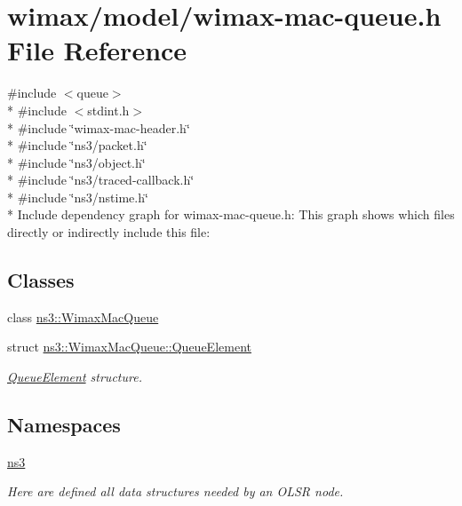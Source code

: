 \hypertarget{wimax-mac-queue_8h}{}\section{wimax/model/wimax-\/mac-\/queue.h File Reference}
\label{wimax-mac-queue_8h}
{\ttfamily \#include $<$queue$>$}\\*
{\ttfamily \#include $<$stdint.\+h$>$}\\*
{\ttfamily \#include \char`\"{}wimax-\/mac-\/header.\+h\char`\"{}}\\*
{\ttfamily \#include \char`\"{}ns3/packet.\+h\char`\"{}}\\*
{\ttfamily \#include \char`\"{}ns3/object.\+h\char`\"{}}\\*
{\ttfamily \#include \char`\"{}ns3/traced-\/callback.\+h\char`\"{}}\\*
{\ttfamily \#include \char`\"{}ns3/nstime.\+h\char`\"{}}\\*
Include dependency graph for wimax-\/mac-\/queue.h\+:
This graph shows which files directly or indirectly include this file\+:
\subsection*{Classes}
\begin{DoxyCompactItemize}
\item 
class \hyperlink{classns3_1_1WimaxMacQueue}{ns3\+::\+Wimax\+Mac\+Queue}
\item 
struct \hyperlink{structns3_1_1WimaxMacQueue_1_1QueueElement}{ns3\+::\+Wimax\+Mac\+Queue\+::\+Queue\+Element}
\begin{DoxyCompactList}\small\item\em \hyperlink{structns3_1_1WimaxMacQueue_1_1QueueElement}{Queue\+Element} structure. \end{DoxyCompactList}\end{DoxyCompactItemize}
\subsection*{Namespaces}
\begin{DoxyCompactItemize}
\item 
 \hyperlink{namespacens3}{ns3}
\begin{DoxyCompactList}\small\item\em Here are defined all data structures needed by an O\+L\+SR node. \end{DoxyCompactList}\end{DoxyCompactItemize}
